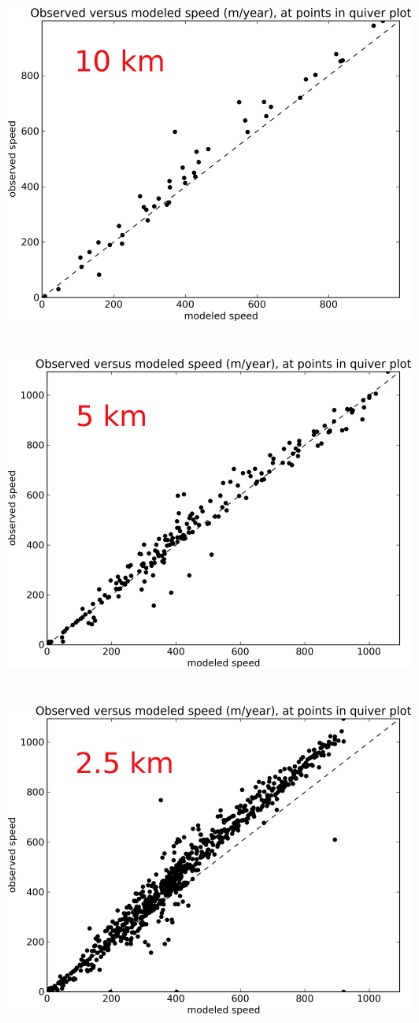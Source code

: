 \documentclass[hide notes,intlimits]{beamer}
\begin{document}
\begin{frame}
\begin{columns}
\begin{column}{0.3\textwidth}
      \includegraphics[width=0.8\textwidth]{rossscatter_10km.png}\\
      \rule{0pt}{5mm}\\
      \includegraphics[width=0.8\textwidth]{rossscatter_5km.png}\\
      \rule{0pt}{5mm}\\
      \includegraphics[width=0.8\textwidth]{rossscatter_2_5km.png}
\end{column}
\end{columns}
\end{frame}
\end{document}

